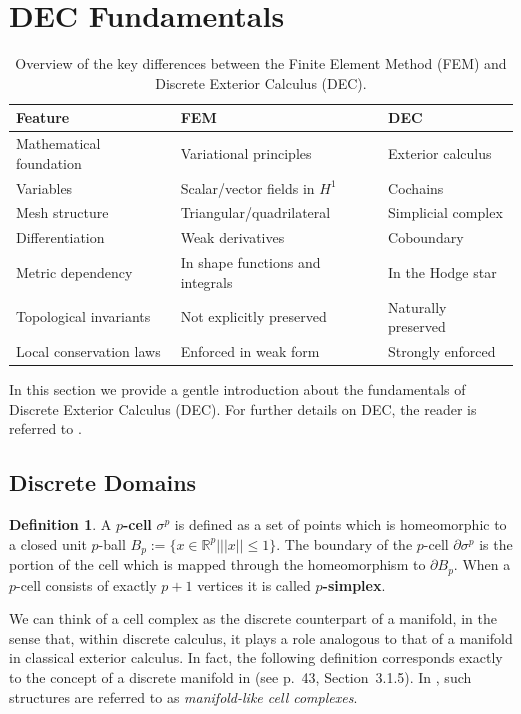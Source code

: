\documentclass{article}
\theoremstyle{definition} %
\newtheorem{Def}{Definition}
\theoremstyle{plain} %
\theoremstyle{remark} %
\newcommand{\rr}{\mathbb{R}}
\begin{document}
\section{DEC Fundamentals}
\label{sec: dec}
\begin{table}[t!]
\centering
\begin{tabularx}{\textwidth}{@{}lXX@{}}
\toprule
\textbf{Feature} & \textbf{FEM} & \textbf{DEC} \\
\midrule
Mathematical foundation & Variational principles & Exterior calculus \\
Variables & Scalar/vector fields in $H^1$ & Cochains \\
Mesh structure & Triangular/quadrilateral & Simplicial complex\\
Differentiation & Weak derivatives & Coboundary \\
Metric dependency & In shape functions and integrals & In the Hodge star \\
Topological invariants & Not explicitly preserved & Naturally preserved \\
Local conservation laws & Enforced in weak form & Strongly enforced \\
\bottomrule
\end{tabularx}
\caption{Overview of the key differences between the Finite Element Method (FEM) and Discrete Exterior Calculus (DEC).}
\label{tab: fem_vs_dec}
\end{table}
In this section we provide a gentle introduction about the fundamentals of Discrete Exterior Calculus (DEC). For further details on DEC, the reader is referred to \cite{hirani2003discrete, grinspun2006discrete, desbrun2005discrete, crane2018discrete, grady2010discrete}.

\subsection{Discrete Domains}
\begin{Def}
        A \textbf{$p$-cell} $\sigma^p$ is defined as a set of points which is homeomorphic to a closed unit $p$-ball $B_p := \{x \in \rr^p | ||x|| \leq 1\}$. The boundary of the $p$-cell $\partial \sigma^p$ is the portion of the cell which is mapped through the homeomorphism to $\partial B_p$.
        When a $p$-cell consists of exactly $p+1$ vertices it is called \textbf{$p$-simplex}.
\end{Def}

We can think of a cell complex as the discrete counterpart of a manifold, in the sense that, within discrete calculus, it plays a role analogous to that of a manifold in classical exterior calculus. 
In fact, the following definition corresponds exactly to the concept of a discrete manifold in \cite{grinspun2006discrete} (see p.~43, Section~3.1.5). 
In \cite{hirani2003discrete}, such structures are referred to as \textsl{manifold-like cell complexes}. 
\end{document}
